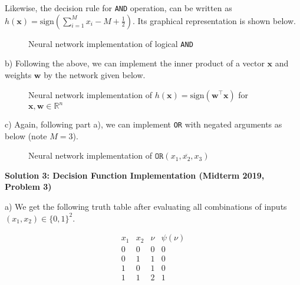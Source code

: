 \documentclass{article}
\newcommand{\R}{\mathbb{R}}
\renewcommand{\vec}[1]{\mathbf{#1}}
\begin{document}
    Likewise, the decision rule for \texttt{AND} operation, can be written as
    $h(\vec{x}) = \text{sign}\left(\sum_{i=1}^M x_i - M + \frac{1}{2}\right)$.
    Its graphical representation is shown below.
    \begin{figure}[!h]
        \caption{Neural network implementation of logical \texttt{AND}}
    \end{figure}
    
    \pagebreak

    b) Following the above, we can implement the inner product of a vector 
    $\vec{x}$ and weights $\vec{w}$ by the network given below.
    \begin{figure}[!ht]
        \caption{Neural network implementation of $h(\vec{x}) = \text{sign}
        (\vec{w}^\top\vec{x})$ for $\vec{x}, \vec{w} \in \R^n$}
    \end{figure}
    
    c) Again, following part a), we can implement \texttt{OR} with negated 
    arguments as below (note $M=3$). 
    \begin{figure}[!ht]
        \caption{Neural network implementation of $\texttt{OR}(x_1,\overline
        {x_2},x_3)$}
    \end{figure}


    \vspace{0.5cm}

    \textbf{Solution 3: Decision Function Implementation (Midterm 2019, 
    Problem 3)}

    a) We get the following truth table after evaluating all combinations of
    inputs $(x_1, x_2) \in \{0,1\}^2$.
    
    \begin{table}[h]
        \[
            \begin{array}{cccc}
                x_1 & x_2 & \nu & \psi(\nu) \\ \hline
                0 & 0 & 0 & 0 \\
                0 & 1 & 1 & 0 \\
                1 & 0 & 1 & 0 \\
                1 & 1 & 2 & 1
            \end{array}
        \]
    \end{table}
\end{document}
